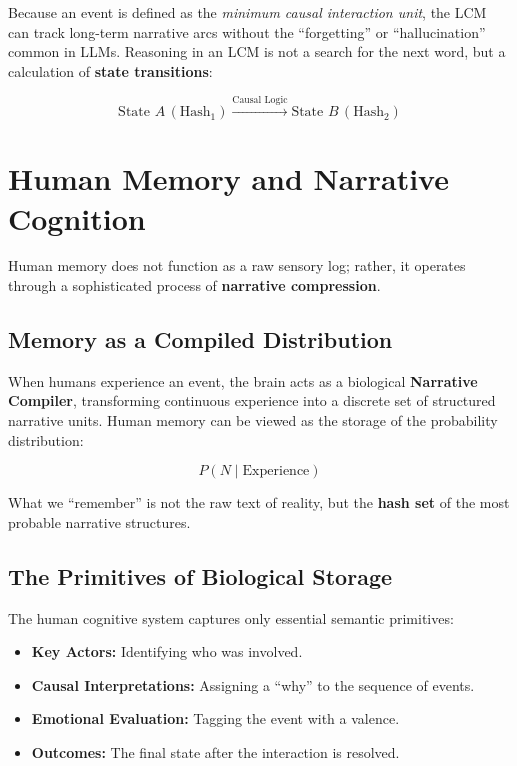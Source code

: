 \documentclass[11pt,a4paper]{article}
\begin{document}
Because an event is defined as the \emph{minimum causal interaction
unit}, the LCM can track long-term narrative arcs without the
``forgetting'' or ``hallucination'' common in LLMs. Reasoning in an LCM
is not a search for the next word, but a calculation of \textbf{state
transitions}:

\begin{equation}
  \text{State } A\,(\mathrm{Hash}_1)
  \xrightarrow{\text{Causal Logic}}
  \text{State } B\,(\mathrm{Hash}_2)
\end{equation}

\section{Human Memory and Narrative Cognition}

Human memory does not function as a raw sensory log; rather, it
operates through a sophisticated process of \textbf{narrative
compression}.

\subsection{Memory as a Compiled Distribution}

When humans experience an event, the brain acts as a biological
\textbf{Narrative Compiler}, transforming continuous experience into a
discrete set of structured narrative units. Human memory can be viewed
as the storage of the probability distribution:

\begin{equation}
  P(N \mid \text{Experience})
\end{equation}

What we ``remember'' is not the raw text of reality, but the
\textbf{hash set} of the most probable narrative structures.

\subsection{The Primitives of Biological Storage}

The human cognitive system captures only essential semantic primitives:

\begin{itemize}[noitemsep]
  \item \textbf{Key Actors:} Identifying who was involved.
  \item \textbf{Causal Interpretations:} Assigning a ``why'' to the sequence of events.
  \item \textbf{Emotional Evaluation:} Tagging the event with a valence.
  \item \textbf{Outcomes:} The final state after the interaction is resolved.
\end{itemize}
\end{document}
